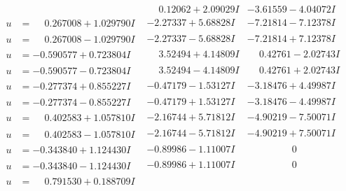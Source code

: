 \documentclass[1p]{elsarticle_modified}
\theoremstyle{definition}
\begin{document}
$$\begin{array}{c|c|c}
 & \phantom{-}0.12062 + 2.09029 I & -3.61559 - 4.04072 I \\ \hline\begin{aligned}
u &= \phantom{-}0.267008 + 1.029790 I\end{aligned}
 & -2.27337 + 5.68828 I & -7.21814 - 7.12378 I \\ \hline\begin{aligned}
u &= \phantom{-}0.267008 - 1.029790 I\end{aligned}
 & -2.27337 - 5.68828 I & -7.21814 + 7.12378 I \\ \hline\begin{aligned}
u &= -0.590577 + 0.723804 I\end{aligned}
 & \phantom{-}3.52494 + 4.14809 I & \phantom{-}0.42761 - 2.02743 I \\ \hline\begin{aligned}
u &= -0.590577 - 0.723804 I\end{aligned}
 & \phantom{-}3.52494 - 4.14809 I & \phantom{-}0.42761 + 2.02743 I \\ \hline\begin{aligned}
u &= -0.277374 + 0.855227 I\end{aligned}
 & -0.47179 - 1.53127 I & -3.18476 + 4.49987 I \\ \hline\begin{aligned}
u &= -0.277374 - 0.855227 I\end{aligned}
 & -0.47179 + 1.53127 I & -3.18476 - 4.49987 I \\ \hline\begin{aligned}
u &= \phantom{-}0.402583 + 1.057810 I\end{aligned}
 & -2.16744 + 5.71812 I & -4.90219 - 7.50071 I \\ \hline\begin{aligned}
u &= \phantom{-}0.402583 - 1.057810 I\end{aligned}
 & -2.16744 - 5.71812 I & -4.90219 + 7.50071 I \\ \hline\begin{aligned}
u &= -0.343840 + 1.124430 I\end{aligned}
 & -0.89986 - 1.11007 I & \phantom{-0.000000 } 0 \\ \hline\begin{aligned}
u &= -0.343840 - 1.124430 I\end{aligned}
 & -0.89986 + 1.11007 I & \phantom{-0.000000 } 0 \\ \hline\begin{aligned}
u &= \phantom{-}0.791530 + 0.188709 I\end{aligned}

\end{array}$$
\end{document}
